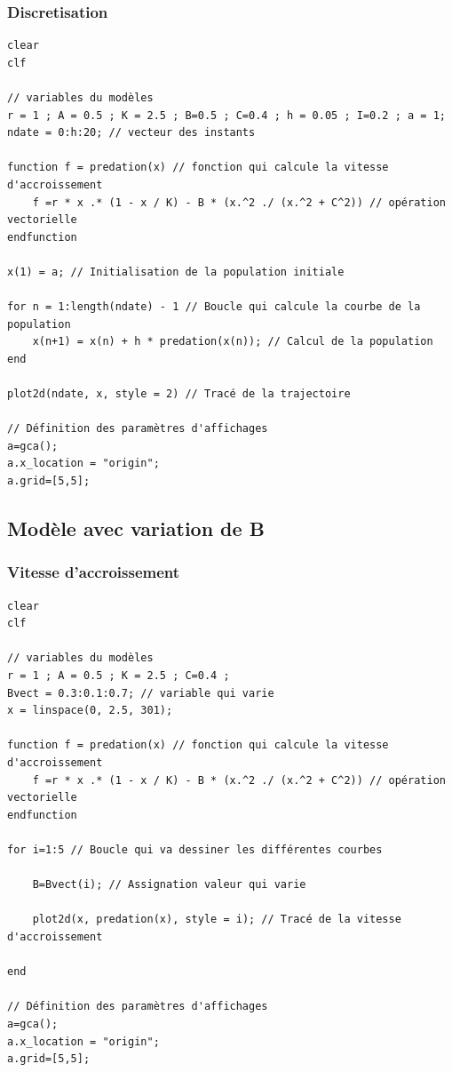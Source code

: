 \documentclass{article}
\begin{document}
\subsubsection{Discretisation}

\begin{verbatim}
clear
clf

// variables du modèles
r = 1 ; A = 0.5 ; K = 2.5 ; B=0.5 ; C=0.4 ; h = 0.05 ; I=0.2 ; a = 1;
ndate = 0:h:20; // vecteur des instants

function f = predation(x) // fonction qui calcule la vitesse d'accroissement
    f =r * x .* (1 - x / K) - B * (x.^2 ./ (x.^2 + C^2)) // opération vectorielle
endfunction

x(1) = a; // Initialisation de la population initiale

for n = 1:length(ndate) - 1 // Boucle qui calcule la courbe de la population
    x(n+1) = x(n) + h * predation(x(n)); // Calcul de la population
end

plot2d(ndate, x, style = 2) // Tracé de la trajectoire

// Définition des paramètres d'affichages
a=gca();
a.x_location = "origin";
a.grid=[5,5];
\end{verbatim}

\subsection{Modèle avec variation de B}

\subsubsection{Vitesse d'accroissement}

\begin{verbatim}
clear
clf

// variables du modèles
r = 1 ; A = 0.5 ; K = 2.5 ; C=0.4 ;
Bvect = 0.3:0.1:0.7; // variable qui varie
x = linspace(0, 2.5, 301);

function f = predation(x) // fonction qui calcule la vitesse d'accroissement
    f =r * x .* (1 - x / K) - B * (x.^2 ./ (x.^2 + C^2)) // opération vectorielle
endfunction

for i=1:5 // Boucle qui va dessiner les différentes courbes

    B=Bvect(i); // Assignation valeur qui varie

    plot2d(x, predation(x), style = i); // Tracé de la vitesse d'accroissement

end

// Définition des paramètres d'affichages
a=gca();
a.x_location = "origin";
a.grid=[5,5];
\end{verbatim}
\end{document}
